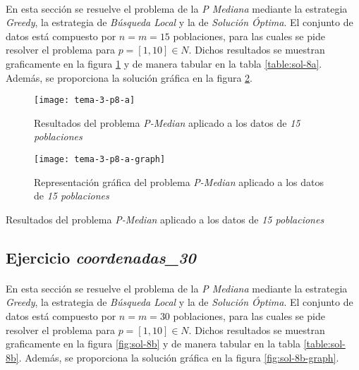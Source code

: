 \documentclass[spanish]{article}
\begin{document}
			\paragraph{}
			En esta sección se resuelve el problema de la \emph{P Mediana} mediante la estrategia \emph{Greedy}, la estrategia de \emph{Búsqueda Local} y la de \emph{Solución Óptima}. El conjunto de datos está compuesto por $n = m = 15$ poblaciones, para las cuales se pide resolver el problema para $p = [1,10] \in N$. Dichos resultados se muestran graficamente en la figura \ref{fig:sol-8a} y de manera tabular en la tabla \ref{table:sol-8a}. Además, se proporciona la solución gráfica en la figura \ref{fig:sol-8a-graph}.

			\begin{figure}[h]
				\begin{center}
					\texttt{[image: tema-3-p8-a]}
				\end{center}
				\caption{Resultados del problema \emph{P-Median} aplicado a los datos de \emph{15 poblaciones}}
				\label{fig:sol-8a}
			\end{figure}

			\begin{figure}[h]
				\begin{center}
					\texttt{[image: tema-3-p8-a-graph]}
				\end{center}
				\caption{Representación gráfica del problema \emph{P-Median} aplicado a los datos de \emph{15 poblaciones}}
				\label{fig:sol-8a-graph}
			\end{figure}

			\begin{table}[h]
				\begin{center}
				\end{center}
				\caption{Resultados del problema \emph{P-Median} aplicado a los datos de \emph{15 poblaciones}}
				\label{table:sol-8a}
			\end{table}


		\subsection{Ejercicio \emph{coordenadas\_30}}
		\label{sec:e-8b}

			\paragraph{}
			En esta sección se resuelve el problema de la \emph{P Mediana} mediante la estrategia \emph{Greedy}, la estrategia de \emph{Búsqueda Local} y la de \emph{Solución Óptima}. El conjunto de datos está compuesto por $n = m = 30$ poblaciones, para las cuales se pide resolver el problema para $p = [1,10] \in N$. Dichos resultados se muestran graficamente en la figura \ref{fig:sol-8b} y de manera tabular en la tabla \ref{table:sol-8b}. Además, se proporciona la solución gráfica en la figura \ref{fig:sol-8b-graph}.
\end{document}
